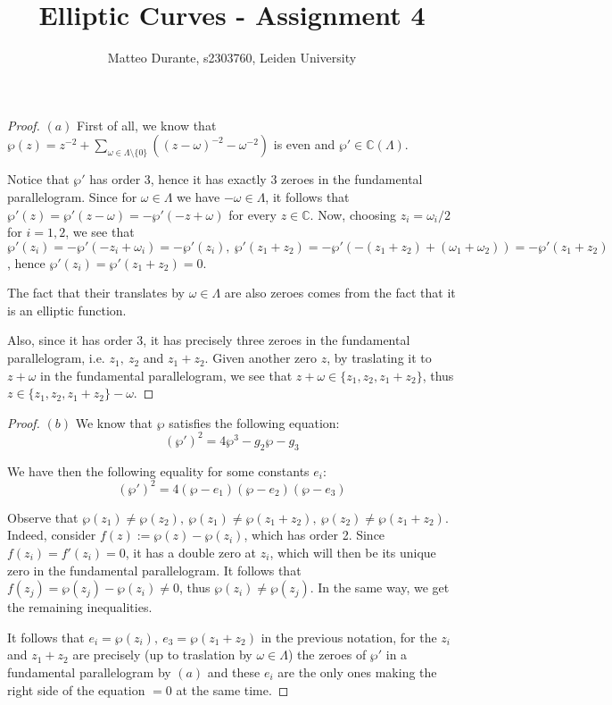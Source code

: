 \documentclass{article}
\newcommand{\numberset}{\mathbb}
\newcommand{\C}{\numberset{C}}
\newcommand{\exercise}[1]{\noindent {\bf Exercise #1}}
\begin{document}
\title{Elliptic Curves - Assignment 4}

\author{Matteo Durante, s2303760, Leiden University}

\maketitle

\exercise{2}

\begin{proof}
	$(a)$ First of all, we know that $\wp(z)=z^{-2}+\sum_{\omega\in\Lambda\setminus\{0\}}((z-\omega)^{-2}-\omega^{-2})$ is even and $\wp'\in\C(\Lambda)$.
	
	Notice that $\wp'$ has order 3, hence it has exactly 3 zeroes in the fundamental parallelogram. Since for $\omega\in\Lambda$ we have $-\omega\in\Lambda$, it follows that $\wp'(z)=\wp'(z-\omega)=-\wp'(-z+\omega)$ for every $z\in\C$. Now, choosing $z_i=\omega_i/2$ for $i=1,2$, we see that $\wp'(z_i)=-\wp'(-z_i+\omega_i)=-\wp'(z_i),\ \wp'(z_1+z_2)=-\wp'(-(z_1+z_2)+(\omega_1+\omega_2))=-\wp'(z_1+z_2)$, hence $\wp'(z_i)=\wp'(z_1+z_2)=0$.
	
	The fact that their translates by $\omega\in\Lambda$ are also zeroes comes from the fact that it is an elliptic function.
	
	Also, since it has order 3, it has precisely three zeroes in the fundamental parallelogram, i.e. $z_1,\ z_2$ and $z_1+z_2$. Given another zero $z$, by traslating it to $z+\omega$ in the fundamental parallelogram, we see that $z+\omega\in\{z_1,z_2,z_1+z_2\}$, thus $z\in\{z_1,z_2,z_1+z_2\}-\omega$.
\end{proof}

\begin{proof}
	$(b)$ We know that $\wp$ satisfies the following equation:$$(\wp')^2=4\wp^3-g_2\wp-g_3$$
	
	We have then the following equality for some constants $e_i$:$$(\wp')^2=4(\wp-e_1)(\wp-e_2)(\wp-e_3)$$
	
	Observe that $\wp(z_1)\neq\wp(z_2),\ \wp(z_1)\neq\wp(z_1+z_2),\ \wp(z_2)\neq\wp(z_1+z_2)$. Indeed, consider $f(z):=\wp(z)-\wp(z_i)$, which has order 2. Since $f(z_i)=f'(z_i)=0$, it has a double zero at $z_i$, which will then be its unique zero in the fundamental parallelogram. It follows that $f(z_j)=\wp(z_j)-\wp(z_i)\neq 0$, thus $\wp(z_i)\neq\wp(z_j)$. In the same way, we get the remaining inequalities.	
	
	It follows that $e_i=\wp(z_i),\ e_3=\wp(z_1+z_2)$ in the previous notation, for the $z_i$ and $z_1+z_2$ are precisely (up to traslation by $\omega\in\Lambda$) the zeroes of $\wp'$ in a fundamental parallelogram by $(a)$ and these $e_i$ are the only ones making the right side of the equation $=0$ at the same time.
\end{proof}
\end{document}
